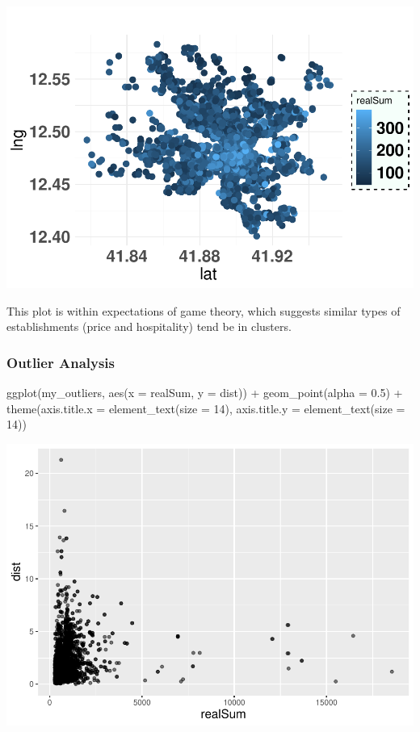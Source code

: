 \documentclass[
]{article}
\newenvironment{Shaded}{\begin{snugshade}}{\end{snugshade}}
\newcommand{\AttributeTok}[1]{\textcolor[rgb]{0.77,0.63,0.00}{#1}}
\newcommand{\DecValTok}[1]{\textcolor[rgb]{0.00,0.00,0.81}{#1}}
\newcommand{\FloatTok}[1]{\textcolor[rgb]{0.00,0.00,0.81}{#1}}
\newcommand{\FunctionTok}[1]{\textcolor[rgb]{0.00,0.00,0.00}{#1}}
\newcommand{\NormalTok}[1]{#1}
\newcommand{\SpecialCharTok}[1]{\textcolor[rgb]{0.00,0.00,0.00}{#1}}
\begin{document}
\includegraphics{Project_files/figure-latex/unnamed-chunk-9-1.pdf}

This plot is within expectations of game theory, which suggests similar
types of establishments (price and hospitality) tend be in clusters.

\hypertarget{outlier-analysis}{%
\subsubsection{Outlier Analysis}\label{outlier-analysis}}

\begin{Shaded}
\begin{Highlighting}[]
\FunctionTok{ggplot}\NormalTok{(my\_outliers, }\FunctionTok{aes}\NormalTok{(}\AttributeTok{x =}\NormalTok{ realSum, }\AttributeTok{y =}\NormalTok{ dist)) }\SpecialCharTok{+} \FunctionTok{geom\_point}\NormalTok{(}\AttributeTok{alpha =} \FloatTok{0.5}\NormalTok{) }\SpecialCharTok{+}
    \FunctionTok{theme}\NormalTok{(}\AttributeTok{axis.title.x =} \FunctionTok{element\_text}\NormalTok{(}\AttributeTok{size =} \DecValTok{14}\NormalTok{), }\AttributeTok{axis.title.y =} \FunctionTok{element\_text}\NormalTok{(}\AttributeTok{size =} \DecValTok{14}\NormalTok{))}
\end{Highlighting}
\end{Shaded}

\includegraphics{Project_files/figure-latex/unnamed-chunk-10-1.pdf}
\end{document}
